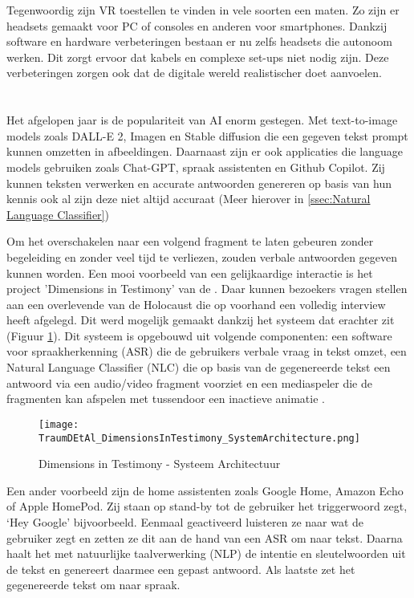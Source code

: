 Tegenwoordig zijn VR toestellen te vinden in vele soorten een maten. Zo zijn er headsets gemaakt voor PC of consoles en anderen voor smartphones. Dankzij software en hardware verbeteringen bestaan er nu zelfs headsets die autonoom werken. Dit zorgt ervoor dat kabels en complexe set-ups niet nodig zijn. Deze verbeteringen zorgen ook dat de digitale wereld realistischer doet aanvoelen.

\section{}%
Het afgelopen jaar is de populariteit van AI enorm gestegen. Met text-to-image models zoals DALL-E 2, Imagen en Stable diffusion die een gegeven tekst prompt kunnen omzetten in afbeeldingen. Daarnaast zijn er ook applicaties die language models gebruiken zoals Chat-GPT, spraak assistenten en Github Copilot. Zij kunnen teksten verwerken en accurate antwoorden genereren op basis van hun kennis ook al zijn deze niet altijd accuraat (Meer hierover in \ref{ssec:Natural Language Classifier})

Om het overschakelen naar een volgend fragment te laten gebeuren zonder begeleiding en zonder veel tijd te verliezen, zouden verbale antwoorden gegeven kunnen worden. Een mooi voorbeeld van een gelijkaardige interactie is het project 'Dimensions in Testimony' van de \textcite{USCShoahFoundation2020}. Daar kunnen bezoekers vragen stellen aan een overlevende van de Holocaust die op voorhand een volledig interview heeft afgelegd. Dit werd mogelijk gemaakt dankzij het systeem dat erachter zit (Figuur \ref{fig:DiTArchitecture}). Dit systeem is opgebouwd uit volgende componenten: een software voor spraakherkenning (ASR) die de gebruikers verbale vraag in tekst omzet, een Natural Language Classifier (NLC) die op basis van de gegenereerde tekst een antwoord via een audio/video fragment voorziet en een mediaspeler die de fragmenten kan afspelen met tussendoor een inactieve animatie \autocite{Traum2015}.

\begin{figure}[h]
    \centering
    \texttt{[image: TraumDEtAl\_DimensionsInTestimony\_SystemArchitecture.png]}
    \caption{Dimensions in Testimony - Systeem Architectuur \autocite{Traum2015}}
    \label{fig:DiTArchitecture}
\end{figure}

Een ander voorbeeld zijn de home assistenten zoals Google Home, Amazon Echo of Apple HomePod. Zij staan op stand-by tot de gebruiker het triggerwoord zegt, `Hey Google' bijvoorbeeld. Eenmaal geactiveerd luisteren ze naar wat de gebruiker zegt en zetten ze dit aan de hand van een ASR om naar tekst. Daarna haalt het met natuurlijke taalverwerking (NLP) de intentie en sleutelwoorden uit de tekst en genereert daarmee een gepast antwoord. Als laatste zet het gegenereerde tekst om naar spraak.

